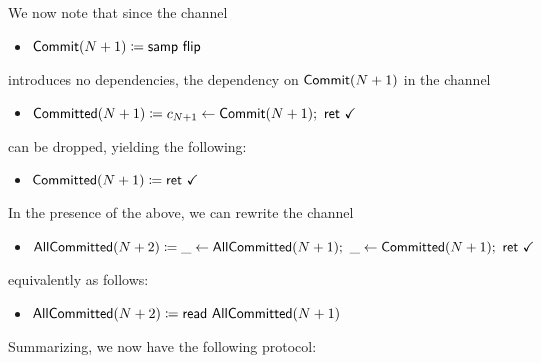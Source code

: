 \noindent We now note that since the channel
\begin{itemize}
\item {\color{blue} $\mathsf{Commit}(N+1) \coloneqq \mathsf{samp} \ \mathsf{flip}$}
\end{itemize}
introduces no dependencies, the dependency on $\mathsf{Commit}(N+1)$ in the channel
\begin{itemize}
\item {\color{magenta} $\Committed(N+1) \coloneqq c_{N+1} \leftarrow \Commit(N+1); \ \ret{\checkmark}$}
\end{itemize}
can be dropped, yielding the following:
\begin{itemize}
\item {\color{magenta} $\mathsf{Committed}(N+1) \coloneqq \mathsf{ret} \ \checkmark$}
\end{itemize}
In the presence of the above, we can rewrite the channel
\begin{itemize}
\item {\color{magenta} $\AllCommitted(N+2) \coloneqq \_ \leftarrow \AllCommitted(N+1); \ \_ \leftarrow \Committed(N+1); \ \ret{\checkmark}$}
\end{itemize}
equivalently as follows:
\begin{itemize}
\item {\color{magenta} $\mathsf{AllCommitted}(N+2) \coloneqq \mathsf{read} \ \mathsf{AllCommitted}(N+1)$}
\end{itemize}
Summarizing, we now have the following protocol:

